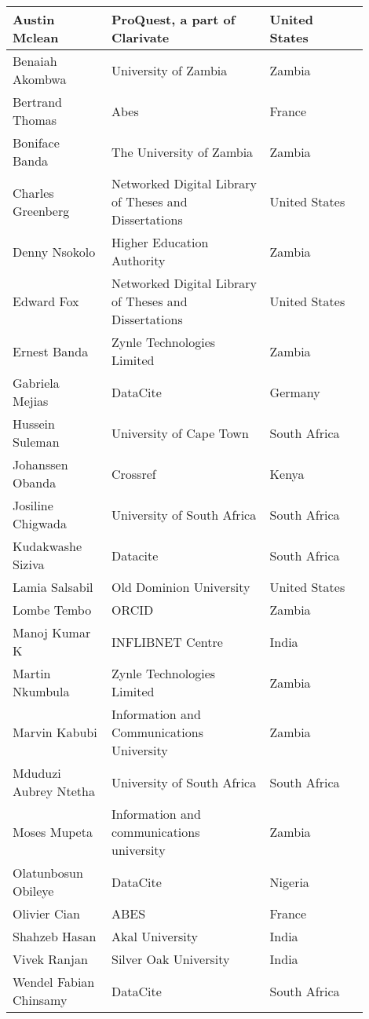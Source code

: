 
\begin{center}
\begin{longtable}{p{0.25\linewidth} p{0.4\linewidth} p{0.25\linewidth}}
\hline
Austin Mclean & ProQuest, a part of Clarivate & United States \\  \hline
Benaiah Akombwa & University of Zambia & Zambia \\  \hline
Bertrand Thomas & Abes & France \\  \hline
Boniface Banda & The University of Zambia & Zambia \\  \hline
Charles Greenberg & Networked Digital Library of Theses and Dissertations & United States \\  \hline
Denny Nsokolo & Higher Education Authority & Zambia \\  \hline
Edward Fox & Networked Digital Library of Theses and Dissertations & United States \\  \hline
Ernest Banda & Zynle Technologies Limited & Zambia \\  \hline
Gabriela Mejias & DataCite & Germany \\  \hline
Hussein Suleman & University of Cape Town & South Africa \\  \hline
Johanssen Obanda & Crossref & Kenya \\  \hline
Josiline Chigwada & University of South Africa & South Africa \\  \hline
Kudakwashe Siziva & Datacite & South Africa \\  \hline
Lamia Salsabil & Old Dominion University & United States \\  \hline
Lombe Tembo & ORCID & Zambia \\  \hline
Manoj Kumar K & INFLIBNET Centre & India \\  \hline
Martin Nkumbula & Zynle Technologies Limited & Zambia \\  \hline
Marvin Kabubi & Information and Communications University & Zambia \\  \hline
Mduduzi Aubrey Ntetha & University of South Africa & South Africa \\  \hline
Moses Mupeta & Information and communications university & Zambia \\  \hline
Olatunbosun Obileye & DataCite & Nigeria \\  \hline
Olivier Cian & ABES & France \\  \hline
Shahzeb Hasan & Akal University & India \\  \hline
Vivek Ranjan & Silver Oak University & India \\  \hline
Wendel Fabian Chinsamy & DataCite & South Africa \\  \hline
\end{longtable}
\end{center}
